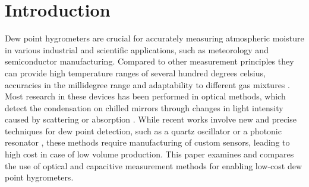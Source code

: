\documentclass[conference,a4paper]{IEEEtran}
\begin{document}
%
\IEEEpeerreviewmaketitle



\section{Introduction}
Dew point hygrometers are crucial for accurately measuring atmospheric moisture in various industrial and scientific applications, such as meteorology and semiconductor manufacturing. Compared to other measurement principles they can provide high temperature ranges of several hundred degrees celsius, accuracies in the millidegree range and adaptability to different gas mixtures \autocite{korotcenkovHandbookHumidityMeasurement2019}. Most research in these devices has been performed in optical methods, which detect the condensation on chilled mirrors through changes in light intensity caused by scattering or absorption \autocite{korotcenkovHandbookHumidityMeasurement2019,chenHumiditySensorsReview2005,srivastavaHumiditySensorOverview2012}. While recent works involve new and precise techniques for dew point detection, such as a quartz oscillator \autocite{nieNewTypeFast2016} or a photonic resonator \autocite{taoUltrahighaccuracyMiniatureDew2016}, these methods require manufacturing of custom sensors, leading to high cost in case of low volume production. This paper examines and compares the use of optical and capacitive measurement methods for enabling low-cost dew point hygrometers.

\end{document}
